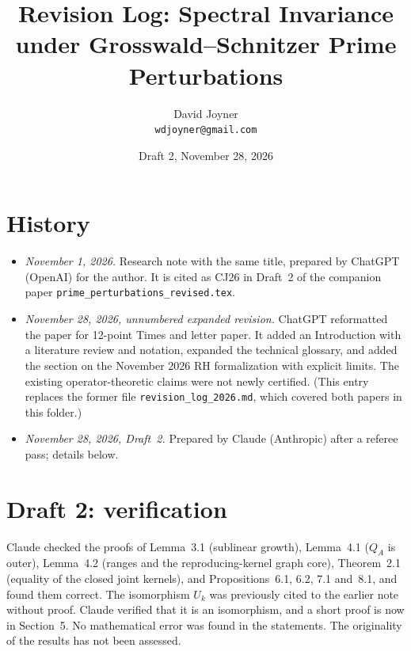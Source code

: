 \documentclass[12pt,letterpaper]{article}
\title{Revision Log: Spectral Invariance under Grosswald--Schnitzer Prime Perturbations}
\author{David Joyner\\\texttt{wdjoyner@gmail.com}}
\date{Draft 2, November 28, 2026}
\begin{document}
\maketitle

\section{History}
\begin{itemize}
\item \emph{November 1, 2026.}  Research note with the same title,
  prepared by ChatGPT (OpenAI) for the author.  It is cited as CJ26 in
  Draft~2 of the companion paper
  \nolinkurl{prime_perturbations_revised.tex}.
\item \emph{November 28, 2026, unnumbered expanded revision.}  ChatGPT
  reformatted the paper for 12-point Times and letter paper.  It added an
  Introduction with a literature review and notation, expanded the
  technical glossary, and added the section on the November 2026 RH
  formalization with explicit limits.  The existing operator-theoretic
  claims were not newly certified.  (This entry replaces the former file
  \nolinkurl{revision_log_2026.md}, which covered both papers in this
  folder.)
\item \emph{November 28, 2026, Draft~2.}  Prepared by Claude (Anthropic)
  after a referee pass; details below.
\end{itemize}

\section{Draft 2: verification}
Claude checked the proofs of Lemma~3.1 (sublinear growth), Lemma~4.1
($Q_A$ is outer), Lemma~4.2 (ranges and the reproducing-kernel graph
core), Theorem~2.1 (equality of the closed joint kernels), and
Propositions~6.1, 6.2, 7.1 and~8.1, and found them correct.  The
isomorphism $U_k$ was previously cited to the earlier note without proof.
Claude verified that it is an isomorphism, and a short proof is now in
Section~5.  No mathematical error was found in the statements.  The
originality of the results has not been assessed.
\end{document}
